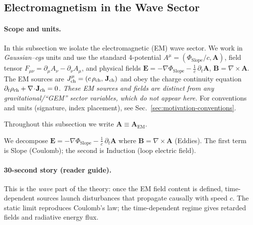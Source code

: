 \subsection{Electromagnetism in the Wave Sector}
\label{subsec:em_wave}

\paragraph{Scope and units.}
In this subsection we isolate the electromagnetic (EM) wave sector. We work in \emph{Gaussian--cgs} units and use the standard 4-potential
\(A^\mu=(\Phi_{\text{Slope}}/c,\mathbf A)\), field tensor \(F_{\mu\nu}=\partial_\mu A_\nu-\partial_\nu A_\mu\),
and physical fields \(\mathbf E=-\nabla\Phi_{\text{Slope}}-\tfrac1c\,\partial_t\mathbf A\), \(\mathbf B=\nabla\times\mathbf A\).
The EM sources are \(J^\mu_{\rm ch}=(c\,\rho_{\rm ch},\,\mathbf J_{\rm ch})\) and obey the
charge continuity equation \(\partial_t\rho_{\rm ch}+\nabla\!\cdot\!\mathbf J_{\rm ch}=0\).
\emph{These EM sources and fields are distinct from any gravitational/``GEM'' sector variables, which do not appear here.}
For conventions and units (signature, index placement), see Sec.~\ref{sec:motivation-conventions}.

Throughout this subsection we write $\mathbf A \equiv \mathbf A_{\text{EM}}$.

We decompose $\mathbf E = -\nabla \Phi_{\text{Slope}} - \tfrac{1}{c}\,\partial_t \mathbf A$ where $\mathbf B=\nabla\times\mathbf A$ (Eddies). The first term is Slope (Coulomb); the second is Induction (loop electric field).

\paragraph{30-second story (reader guide).}
This is the \emph{wave} part of the theory: once the EM field content is defined,
time-dependent sources launch disturbances that propagate causally with speed \(c\).
The static limit reproduces Coulomb's law; the time-dependent regime gives retarded fields and radiative energy flux.

